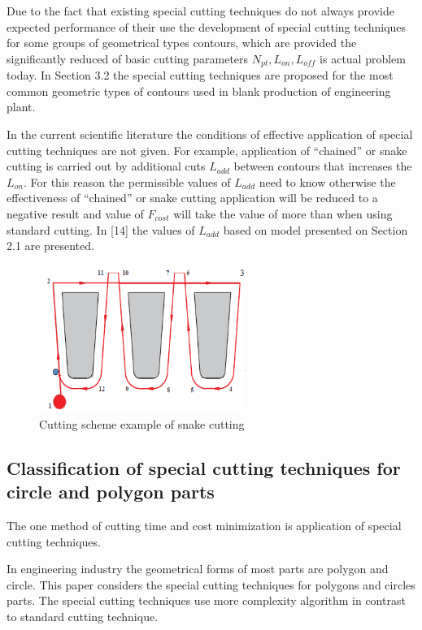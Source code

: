 \documentclass[runningheads]{llncs}
\begin{document}
Due to the fact that existing special cutting techniques
do not always provide expected performance of their use
the development of special cutting techniques
for some groups of geometrical types contours,
which are provided the significantly reduced of basic cutting parameters
$N_{pt}, L_{on}, L_{off}$
is actual problem today.
In Section 3.2 the special cutting techniques are proposed
for the most common geometric types of contours
used in blank production of engineering plant.

In the current scientific literature
the conditions of effective application of special cutting techniques are not given.
For example, application of ``chained'' or snake cutting
is carried out by additional cuts $L_{add}$
between contours that increases the  $L_{on}$.
For this reason the permissible values of  $L_{add}$ need to know
otherwise the effectiveness of ``chained'' or snake cutting application
will be reduced to a negative result and value of $F_{cost}$
will take the value of more than when using standard cutting.
In [14] the values of $L_{add}$ based on model presented on Section 2.1 are presented.

\begin{figure}
  \begin{center}
  \includegraphics[width=0.6\textwidth]{snake.png}
  \caption{Cutting scheme example of snake cutting}
  \label{snake}
  \end{center}
\end{figure}

\subsection{Classification of special cutting techniques for circle and polygon parts}

The one method of cutting time and cost minimization is application of special cutting techniques.

In engineering industry the geometrical forms of most parts are polygon and circle.
This paper considers the special cutting techniques for polygons and circles parts.
The special cutting techniques use more complexity algorithm in contrast to standard cutting technique.
\end{document}
